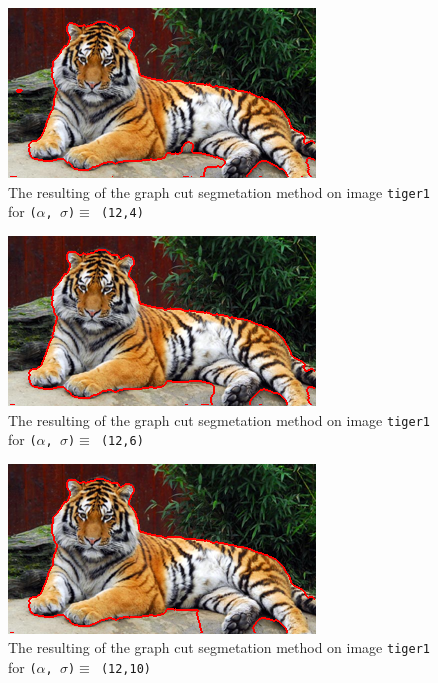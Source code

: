 {  \begin{minipage}{0.45\linewidth}
    \begin{figure}[H]
      \includegraphics[scale=0.5]{./images/04/Q11/var_a_b/tiger1/graphcut2_a12_s4.png}
      \caption{The resulting of the graph cut segmetation method on image \texttt{tiger1} for
        \texttt{($\alpha$, $\sigma$)$ \equiv$ (12,4)}}
      \label{fig:04_tiger12_a12_s4}
    \end{figure}
    \vfill
    \begin{figure}[H]
      \includegraphics[scale=0.5]{./images/04/Q11/var_a_b/tiger1/graphcut2_a12_s6.png}
      \caption{The resulting of the graph cut segmetation method on image \texttt{tiger1} for
        \texttt{($\alpha$, $\sigma$)$ \equiv$ (12,6)}}
      \label{fig:04_tiger12_a12_s6}
    \end{figure}
    \vfill
    \begin{figure}[H]
      \includegraphics[scale=0.5]{./images/04/Q11/var_a_b/tiger1/graphcut2_a12_s10.png}
      \caption{The resulting of the graph cut segmetation method on image \texttt{tiger1} for
        \texttt{($\alpha$, $\sigma$)$ \equiv$ (12,10)}}
      \label{fig:04_tiger12_a12_s10}
    \end{figure}
  \end{minipage}
}


